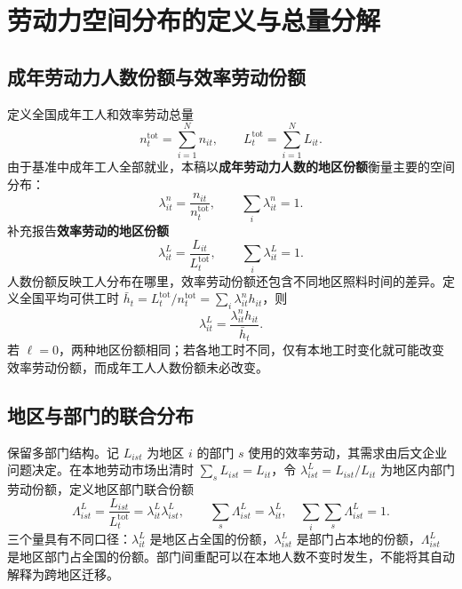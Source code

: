 \documentclass[UTF8,a4paper,zihao=-4,fontset=windows]{ctexart}
\numberwithin{equation}{section}
\begin{document}
\section{劳动力空间分布的定义与总量分解}
\label{sec:lg-spatial-distribution}

\subsection{成年劳动力人数份额与效率劳动份额}
定义全国成年工人和效率劳动总量
\begin{equation}
 n_t^{\mathrm{tot}}=\sum_{i=1}^Nn_{it},\qquad
 L_t^{\mathrm{tot}}=\sum_{i=1}^NL_{it}.
\end{equation}
由于基准中成年工人全部就业，本稿以\textbf{成年劳动力人数的地区份额}衡量主要的空间分布：
\begin{equation}
 \lambda^n_{it}=\frac{n_{it}}{n_t^{\mathrm{tot}}},\qquad
 \sum_i\lambda^n_{it}=1.
 \label{eq:lg-headcount-spatial-share}
\end{equation}
补充报告\textbf{效率劳动的地区份额}
\begin{equation}
 \lambda^L_{it}=\frac{L_{it}}{L_t^{\mathrm{tot}}},\qquad
 \sum_i\lambda^L_{it}=1.
 \label{eq:lg-effective-spatial-share}
\end{equation}
人数份额反映工人分布在哪里，效率劳动份额还包含不同地区照料时间的差异。定义全国平均可供工时 $\bar h_t=L_t^{\mathrm{tot}}/n_t^{\mathrm{tot}}=\sum_i\lambda^n_{it}h_{it}$，则
\begin{equation}
 \lambda^L_{it}=\frac{\lambda^n_{it}h_{it}}{\bar h_t}.
 \label{eq:lg-two-spatial-shares}
\end{equation}
若 $\ell=0$，两种地区份额相同；若各地工时不同，仅有本地工时变化就可能改变效率劳动份额，而成年工人人数份额未必改变。

\subsection{地区与部门的联合分布}
保留多部门结构。记 $L_{ist}$ 为地区 $i$ 的部门 $s$ 使用的效率劳动，其需求由后文企业问题决定。在本地劳动市场出清时 $\sum_sL_{ist}=L_{it}$，令 $\lambda^L_{ist}=L_{ist}/L_{it}$ 为地区内部门劳动份额，定义地区部门联合份额
\begin{equation}
 \Lambda^L_{ist}=\frac{L_{ist}}{L_t^{\mathrm{tot}}}
 =\lambda^L_{it}\lambda^L_{ist},\qquad
 \sum_s\Lambda^L_{ist}=\lambda^L_{it},\quad
 \sum_i\sum_s\Lambda^L_{ist}=1.
 \label{eq:lg-region-sector-joint-share}
\end{equation}
三个量具有不同口径：$\lambda^L_{it}$ 是地区占全国的份额，$\lambda^L_{ist}$ 是部门占本地的份额，$\Lambda^L_{ist}$ 是地区部门占全国的份额。部门间重配可以在本地人数不变时发生，不能将其自动解释为跨地区迁移。
\end{document}

